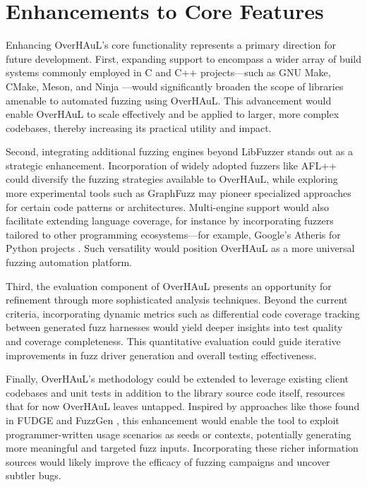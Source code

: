 \documentclass[
  a4paper,
  DIV=11,
  numbers=noendperiod]{scrreprt}
\theoremstyle{definition}
\theoremstyle{remark}
\begin{document}
\section{Enhancements to Core
Features}\label{enhancements-to-core-features}

Enhancing OverHAuL's core functionality represents a primary direction
for future development. First, expanding support to encompass a wider
array of build systems commonly employed in C and C++ projects---such as
GNU Make, CMake, Meson, and Ninja
\autocite{cedilnik2000,feldman1979,martin2025,pakkanen2025}---would
significantly broaden the scope of libraries amenable to automated
fuzzing using OverHAuL. This advancement would enable OverHAuL to scale
effectively and be applied to larger, more complex codebases, thereby
increasing its practical utility and impact.

Second, integrating additional fuzzing engines beyond LibFuzzer stands
out as a strategic enhancement. Incorporation of widely adopted fuzzers
like AFL++ \autocite{aflpp} could diversify the fuzzing strategies
available to OverHAuL, while exploring more experimental tools such as
GraphFuzz \autocite{green2022} may pioneer specialized approaches for
certain code patterns or architectures. Multi-engine support would also
facilitate extending language coverage, for instance by incorporating
fuzzers tailored to other programming ecosystems---for example, Google's
Atheris for Python projects \autocite{atheris}. Such versatility would
position OverHAuL as a more universal fuzzing automation platform.

Third, the evaluation component of OverHAuL presents an opportunity for
refinement through more sophisticated analysis techniques. Beyond the
current criteria, incorporating dynamic metrics such as differential
code coverage tracking between generated fuzz harnesses would yield
deeper insights into test quality and coverage completeness. This
quantitative evaluation could guide iterative improvements in fuzz
driver generation and overall testing effectiveness.

Finally, OverHAuL's methodology could be extended to leverage existing
client codebases and unit tests in addition to the library source code
itself, resources that for now OverHAuL leaves untapped. Inspired by
approaches like those found in FUDGE and FuzzGen
\autocite{fuzzgen,fudge}, this enhancement would enable the tool to
exploit programmer-written usage scenarios as seeds or contexts,
potentially generating more meaningful and targeted fuzz inputs.
Incorporating these richer information sources would likely improve the
efficacy of fuzzing campaigns and uncover subtler bugs.
\end{document}
